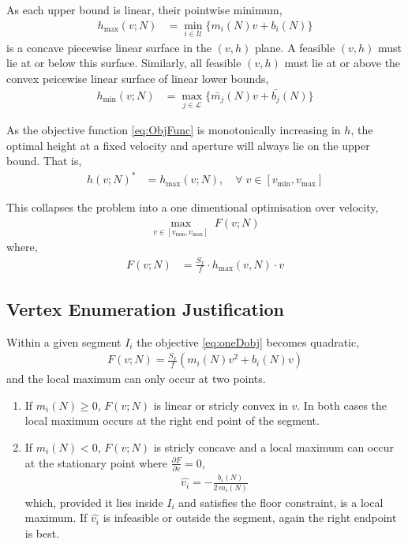 \documentclass[11pt]{article}
\begin{document}
As each upper bound is linear, their pointwise minimum,
\begin{align}
  h_{\max}(v;N) &= \min_{i \in \mathcal{U}}\{m_i(N)v + b_i(N)\}
\end{align}
is a concave piecewise linear surface in the $(v,h)$ plane. A feasible $(v,h)$ must lie at or below this surface. Similarly, all feasible $(v,h)$ must lie at or above the convex peicewise linear surface of linear lower bounds,
\begin{align}
  h_{\min}(v;N) &= \max_{j \in \mathcal{L}}\{\bar{m_j}(N)v + \bar{b_j}(N)\}
\end{align}

As the objective function \ref{eq:ObjFunc} is monotonically increasing in $h$, the optimal height at a fixed velocity and aperture will always lie on the upper bound. That is,
\begin{align}
  h(v;N)^* &= h_{\max}(v;N), \quad \forall \; v \in [v_{\min},v_{\max}]
\end{align}

This collapses the problem into a one dimentional optimisation over velocity,
\begin{align}
  \max_{v\in[v_{\min},v_{\max}]}\;F(v;N) \label{eq:oneDobjmax}
\end{align}
where,
\begin{align}
  F(v;N) &= \frac{S_x}{f} \cdot h_{\max}(v,N) \cdot v \label{eq:oneDobj}
\end{align}


\subsection{Vertex Enumeration Justification}

Within a given segment $I_i$ the objective \ref{eq:oneDobj} becomes quadratic,
\begin{align}
    F(v;N) = \frac{S_x}{f}(m_i(N)v^2 + b_i(N)v)
\end{align}
and the local maximum can only occur at two points.
\begin{enumerate}
  \item If $m_i(N) \geq 0$, $F(v;N)$ is linear or stricly convex in $v$. In both cases the local maximum occurs at the right end point of the segment.
  \item If $m_i(N) < 0$, $F(v;N)$ is stricly concave and a local maximum can occur at the stationary point where $\frac{\partial F}{\partial v} = 0$,
  \begin{align}
    \hat{v_i} = -\frac{b_i(N)}{2\,m_i(N)}
  \end{align} which, provided it lies inside $I_i$ and satisfies the floor constraint, is a local maximum. If $\hat{v_i} $ is infeasible or outside the segment, again the right endpoint is best.
\end{enumerate}
\end{document}
